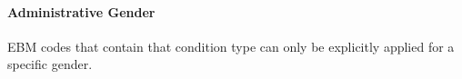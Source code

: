\paragraph{Administrative Gender}\label{subsec:administrative-gender}
EBM codes that contain that condition type can only be explicitly applied for a specific gender.

%

